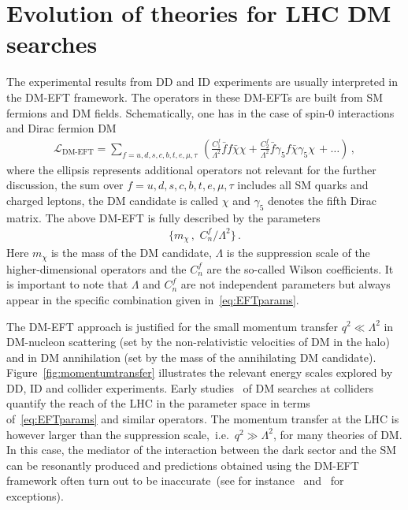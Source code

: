 \documentclass[a4paper, 11pt,notoc]{article}
\begin{document}

\section{Evolution of theories for LHC DM searches} 
\label{sec:evolution}

The experimental results from DD and ID experiments are usually interpreted in the DM-EFT framework. The operators in these DM-EFTs are built from SM fermions and DM fields. Schematically, one has in the case of spin-0 interactions and Dirac fermion DM
\begin{align}\label{eq:EFT}
\mathcal{L}_\text{DM-EFT}= \sum_{f=u,d,s,c,b,t,e,\mu,\tau} \,\left(\frac{C_{1}^f}{\Lambda^2} \bar f f \bar \chi \chi  +\frac{C_{2}^f}{\Lambda^2} \bar  f \gamma_5 f \bar \chi\gamma_5 \chi \,+\ldots \right) \,, 
\end{align}
 where the ellipsis represents additional operators not relevant for the further discussion, the sum over $f=u,d,s,c,b,t,e,\mu,\tau$ includes all SM quarks and charged leptons, the DM candidate is called $\chi$  and $\gamma_5$ denotes the fifth Dirac matrix. The above DM-EFT is fully described by the parameters
\begin{align}\label{eq:EFTparams}
\big\{ m_\chi\,,\,\, C_n^f/\Lambda^2 \big\} \,.
\end{align}
Here $m_\chi$ is the mass of the DM candidate, $\Lambda$ is the suppression scale of the higher-dimensional operators and the $C_n^f$ are the so-called Wilson coefficients. It is important to note that $\Lambda$ and $C_n^f$ are not independent parameters but always appear in the specific combination given in~\eqref{eq:EFTparams}. 

The DM-EFT approach is justified for the small momentum transfer $q^2\ll \Lambda^2$ in DM-nucleon scattering (set by the non-relativistic velocities of DM in the halo) and in DM annihilation (set by the mass of the annihilating DM candidate). Figure~\ref{fig:momentumtransfer}  illustrates the relevant energy scales explored by DD, ID and collider experiments. Early studies~\cite{Cao:2009uw,Beltran:2010ww,Goodman:2010yf,Bai:2010hh,Goodman:2010ku,Fox:2011pm} of DM searches at colliders quantify the reach of the LHC in the parameter space in terms of~\eqref{eq:EFTparams} and similar operators. The momentum transfer at the LHC is however larger than the suppression scale,~i.e.~$q^2 \gg \Lambda^2$, for many theories of DM.  In this case, the mediator of the interaction between the dark sector and the SM can be resonantly produced and predictions  obtained using the DM-EFT framework often turn out to be inaccurate~(see for instance~\cite{Bai:2010hh,Fox:2011fx,Shoemaker:2011vi,Busoni:2013lha,Buchmueller:2013dya,Busoni:2014sya,Busoni:2014haa,Racco:2015dxa} and~\cite{Bruggisser:2016nzw,Bruggisser:2016ixa} for exceptions). 
\end{document}
